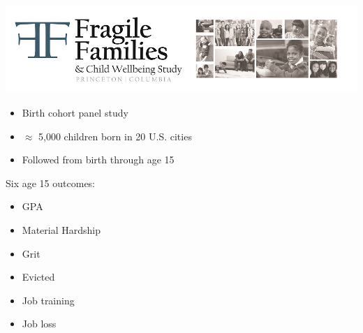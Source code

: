\documentclass{beamer}
\begin{document}

\begin{frame}

\begin{center}
\includegraphics[width=\textwidth]{figures/ff_logo}
\end{center}

\begin{itemize}
\item Birth cohort panel study
\item $\approx$ 5,000 children born in 20 U.S. cities
\item Followed from birth through age 15
\end{itemize}

\end{frame}
\begin{frame}

Six age 15 outcomes:
\begin{itemize}
\item GPA
\item Material Hardship
\item Grit
\item Evicted
\item Job training
\item Job loss
\end{itemize}

\end{frame}
\end{document}
